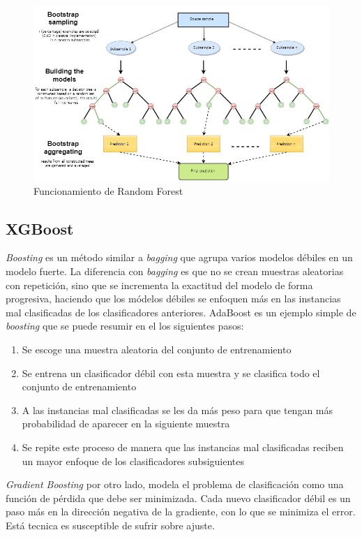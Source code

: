 \begin{figure}[htbp]
	\centering
	\includegraphics[width=\linewidth]{graficos/rf.png}
	\caption{Funcionamiento de Random Forest \citep{mql5:rf}}
	\label{fig:rf}
\end{figure}


\subsection{XGBoost}

\textit{Boosting} es un método similar a \textit{bagging} que agrupa varios modelos débiles en un modelo fuerte. La diferencia con \textit{bagging} es que no se crean muestras aleatorias con repetición, sino que se incrementa la exactitud del modelo de forma progresiva, haciendo que los módelos débiles se enfoquen más en las instancias mal clasificadas de los clasificadores anteriores. AdaBoost es un ejemplo simple de \textit{boosting} que se puede resumir en el los siguientes pasos:

\begin{enumerate}
	\item Se escoge una muestra aleatoria del conjunto de entrenamiento
	\item Se entrena un clasificador débil con esta muestra y se clasifica todo el conjunto de entrenamiento
	\item A las instancias mal clasificadas se les da más peso para que tengan más probabilidad de aparecer en la siguiente muestra
	\item Se repite este proceso de manera que las instancias mal clasificadas reciben un mayor enfoque de los clasificadores subsiguientes
\end{enumerate}

\textit{Gradient Boosting} por otro lado, modela el problema de clasificación como una función de pérdida que debe ser minimizada. Cada nuevo clasificador débil es un paso más en la dirección negativa de la gradiente, con lo que se minimiza el error. Está tecnica es susceptible de sufrir sobre ajuste.

